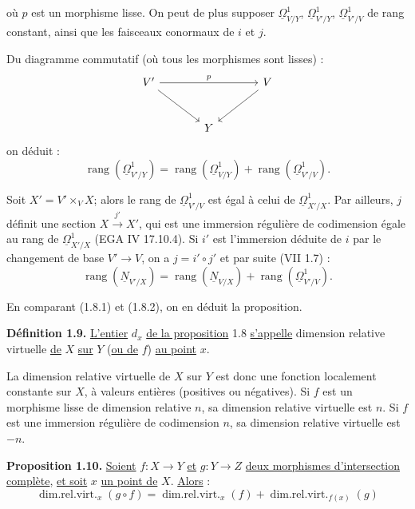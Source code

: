 
où $p$ est un
morphisme lisse. On peut de plus supposer $\underline{\Omega}^1_{V/Y}$, $\underline{\Omega}^1_{V'/Y}$, $\underline{\Omega}^1_{V'/V}$ de rang constant, ainsi que les faisceaux conormaux de $i$ et $j$.

Du diagramme commutatif (où tous les morphismes sont lisses) :
\[
\begin{tikzcd}[column sep=large,row sep=large]
V' \arrow[rr,"p"] \arrow[dr] && V \arrow[dl]\\
& Y &
\end{tikzcd}
\]
on déduit :
\begin{equation}\tag{1.8.1}
\operatorname{rang}(\underline{\Omega}^1_{V'/Y})=
\operatorname{rang}(\underline{\Omega}^1_{V/Y})+
\operatorname{rang}(\underline{\Omega}^1_{V'/V}).
\end{equation}

Soit $X'=V'\times_V X$; alors le rang de $\underline{\Omega}^1_{V'/V}$ est égal à celui de $\underline{\Omega}^1_{X'/X}$. Par ailleurs, $j$ définit une section $X\xrightarrow{j'} X'$, qui est une immersion régulière de codimension égale au rang de $\underline{\Omega}^1_{X'/X}$ (EGA IV 17.10.4). Si $i'$ est l'immersion déduite de $i$ par le changement de base $V'\to V$, on a $j=i'\circ j'$ et par suite (VII 1.7) :
\begin{equation}\tag{1.8.2}
\operatorname{rang}(\underline{N}_{V'/X})=
\operatorname{rang}(\underline{N}_{V/X})+
\operatorname{rang}(\underline{\Omega}^1_{V'/V}).
\end{equation}

En comparant (1.8.1) et (1.8.2), on en déduit la proposition.

\textbf{Définition 1.9.} \uline{L'entier} $d_x$ \uline{de la proposition} 1.8 \uline{s'appelle} dimension relative virtuelle \uline{de} $X$ \uline{sur} $Y$ (\uline{ou de} $f$) \uline{au point} $x$.

La dimension relative virtuelle de $X$ sur $Y$ est donc une fonction localement constante sur $X$, à valeurs entières (positives ou négatives). Si $f$ est un morphisme lisse de dimension relative $n$, sa dimension relative virtuelle est $n$. Si $f$ est une immersion régulière de codimension $n$, sa dimension relative virtuelle est $-n$.

\textbf{Proposition 1.10.} \uline{Soient} $f:X\to Y$ \uline{et} $g:Y\to Z$ \uline{deux morphismes d'intersection complète}, \uline{et soit} $x$ \uline{un point de} $X$. \uline{Alors} :
\[
\operatorname{dim.rel.virt.}_x(g\circ f)=
\operatorname{dim.rel.virt.}_x(f)+
\operatorname{dim.rel.virt.}_{f(x)}(g)
\]
